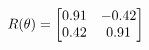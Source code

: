 \documentclass[preview]{standalone}
\begin{document}
\begin{align*}
\special{dvisvgm:raw <g id='unique000'>}R(\theta) = \begin{bmatrix}0.91 & -0.42\\0.42 & 0.91\end{bmatrix}\special{dvisvgm:raw </g>}
\end{align*}
\end{document}
